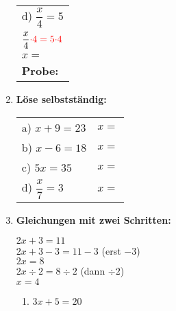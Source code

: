 \begin{enumerate}[label=\arabic*.]
\begin{tabular}{l}
        d) $\dfrac{x}{4} = 5$ \\[2ex]
        $\dfrac{x}{4} \color{red}{\cdot 4} = 5 \color{red}{\cdot 4}$ \\[1ex]
        $x = $ \underline{\hspace{2cm}} \\[3ex]
        \textbf{Probe:} \underline{\hspace{4cm}}
    \end{tabular}

    \vspace{1cm}

    \item \textbf{Löse selbstständig:}

    \vspace{0.5cm}

    \begin{tabular}{ll}
        a) $x + 9 = 23$ & $x = $ \underline{\hspace{2cm}} \\[3ex]
        b) $x - 6 = 18$ & $x = $ \underline{\hspace{2cm}} \\[3ex]
        c) $5x = 35$ & $x = $ \underline{\hspace{2cm}} \\[3ex]
        d) $\dfrac{x}{7} = 3$ & $x = $ \underline{\hspace{2cm}}
    \end{tabular}

    \vspace{1cm}

    \item \textbf{Gleichungen mit zwei Schritten:}

    \vspace{0.5cm}

    \begin{beispielbox}[Beispiel]
        $2x + 3 = 11$ \\
        $2x + 3 - 3 = 11 - 3$ \quad (erst $-3$)\\
        $2x = 8$ \\
        $2x \div 2 = 8 \div 2$ \quad (dann $\div 2$)\\
        $x = 4$
    \end{beispielbox}

    \vspace{0.5cm}

    \begin{enumerate}[label=\alph*)]
        \item $3x + 5 = 20$


\end{enumerate}
\end{enumerate}
